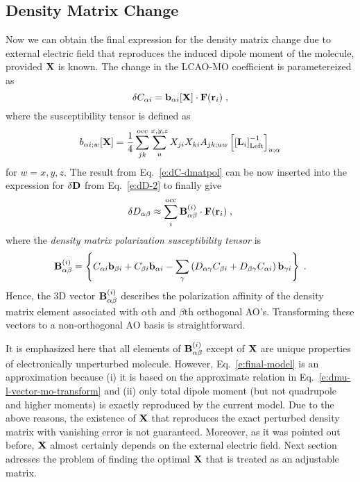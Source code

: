 \documentclass[aip,graphicx]{revtex4-1}
\begin{document}
\subsection{Density Matrix Change}

Now we can obtain the final expression for the density matrix change 
due to external electric field that reproduces the 
induced dipole moment of the molecule, provided ${\bf X}$ is known. 
The change in the LCAO\hyp{}MO coefficient is parametereized as
%
\begin{equation} \label{e:dC-dmatpol}
 \delta C_{\alpha i} = {\bf b}_{\alpha i}[{\bf X}] \cdot {\bf F}({\bf r}_i)  \;,
\end{equation}
%
where the susceptibility tensor is defined as
%
\begin{equation} \label{e:susceptibility-b}
  b_{\alpha i;w}[{\bf X}] = \frac{1}{4} \sum_{jk}^{\rm occ} \sum_u^{x,y,z} X_{ji} X_{ki} A_{jk;uw} 
   \left[ \left[ {\bf L}_i  \right]^{-1}_{\rm Left} \right]_{u;\alpha}  
\end{equation}
%
for $w=x,y,z$. The result from Eq.~\eqref{e:dC-dmatpol} can be now inserted into 
the expression for $\delta {\bf D}$ from Eq.~\eqref{e:dD-2} to finally give
%
\begin{equation}\label{e:final-model}
 \delta D_{\alpha\beta} \approx \sum_i^{\rm occ} {\bf B}^{(i)}_{\alpha\beta} \cdot {\bf F}({\bf r}_i)  \;,
\end{equation}
%
where the \emph{density matrix polarization susceptibility tensor} is
%
\begin{equation}  \label{e:susceptibility-B}
 {\bf B}^{(i)}_{\alpha\beta} = \left\{
%
                               C_{\alpha i} {\bf b}_{\beta i} + C_{\beta i} {\bf b}_{\alpha i}
                               - \sum_\gamma 
                                 \left( 
               D_{\alpha\gamma} C_{\beta i} + D_{\beta\gamma} C_{\alpha i}
                                 \right)
                                           {\bf b}_{\gamma i}
%
\right\}  \;.
\end{equation}
%
Hence, the 3D vector ${\bf B}^{(i)}_{\alpha\beta}$ describes the polarization affinity
of the density matrix element associated with $\alpha$th and $\beta$th orthogonal AO's.
Transforming these vectors to a non\hyp{}orthogonal AO basis is straightforward.

It is emphasized here that all elements of ${\bf B}_{\alpha\beta}^{(i)}$ except of ${\bf X}$
are unique properties of electronically unperturbed molecule. 
However, Eq.~\eqref{e:final-model} is an approximation because (i) it is based on the approximate
relation in Eq.~\eqref{e:dmu-l-vector-mo-transform} and (ii) only total dipole moment (but not quadrupole
and higher moments) is exactly
reproduced by the current model. Due to the above reasons, the existence of ${\bf X}$ that
reproduces the exact perturbed density matrix with vanishing error is not guaranteed. 
Moreover, as it was pointed out before, ${\bf X}$ almost certainly depends on the external electric field. 
Next section adresses the problem of finding the optimal ${\bf X}$ that is treated as an adjustable
matrix.
\end{document}
